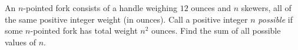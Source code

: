An $n$-pointed fork consists of a handle weighing $12$ ounces and $n$ skewers, all of the same positive integer weight (in ounces). Call a positive integer $n$ \emph{possible} if some $n$-pointed fork has total weight $n^2$ ounces. Find the sum of all possible values of $n$.
